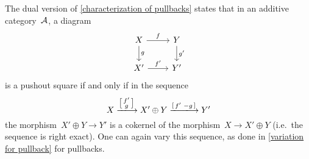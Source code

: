 \begin{remark}
  \label{pushout via exact sequence}
  The dual version of \cref{characterization of pullbacks} states that in an additive category~$\mathcal{A}$, a diagram
  \[
    \begin{tikzcd}
        X
        \arrow{r}[above]{f}
        \arrow{d}[right]{g}
      & Y
        \arrow{d}[right]{g'}
      \\
        X'
        \arrow{r}[above]{f'}
      & Y'
    \end{tikzcd}
  \]
  is a pushout square if and only if in the sequence
  \[
      X
    \xlongto{ \begin{bsmallmatrix} f' \\ g \end{bsmallmatrix} }
      X' \oplus Y
    \xlongto{ \begin{bsmallmatrix} f' & -g \end{bsmallmatrix} }
      Y'
  \]
  the morphism~$X' \oplus Y \to Y'$ is a cokernel of the morphism~$X \to X' \oplus Y$ (i.e.\ the sequence is right exact).
  One can again vary this sequence, as done in \cref{variation for pullback} for pullbacks.
\end{remark}


